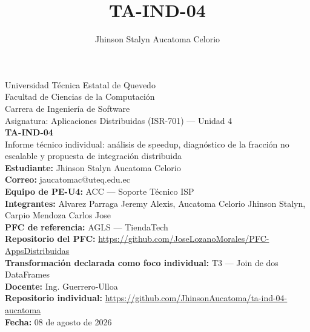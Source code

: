 \documentclass[11pt,a4paper]{article}
\title{TA-IND-04}
\author{Jhinson Stalyn Aucatoma Celorio}
\date{}
\begin{document}
    \begin{titlepage}
        \centering

        {\large Universidad Técnica Estatal de Quevedo}\\
        {\large Facultad de Ciencias de la Computación}\\
        {\large Carrera de Ingeniería de Software}\\[0.5cm]

        {\large Asignatura: Aplicaciones Distribuidas (ISR-701) --- Unidad 4}\\[0.3cm]

        \vspace{1cm}
        {\Large \textbf{TA-IND-04}}\\[0.2cm]
        {\large Informe técnico individual: análisis de speedup, diagnóstico de
        la fracción no escalable y propuesta de integración distribuida}\\[1cm]

        \vspace{1cm}
        \textbf{Estudiante:} Jhinson Stalyn Aucatoma Celorio\\
        \textbf{Correo:} jaucatomac@uteq.edu.ec\\[0.5cm]

        \textbf{Equipo de PE-U4:} ACC --- Soporte Técnico ISP\\
        \textbf{Integrantes:} Alvarez Parraga Jeremy Alexis, Aucatoma Celorio
        Jhinson Stalyn, Carpio Mendoza Carlos Jose\\[0.5cm]

        \textbf{PFC de referencia:} AGLS --- TiendaTech\\
        \textbf{Repositorio del PFC:} \url{https://github.com/JoseLozanoMorales/PFC-AppsDistribuidas}\\[0.5cm]

        \textbf{Transformación declarada como foco individual:} T3 --- Join de
        dos DataFrames\\[0.5cm]

        \textbf{Docente:} Ing. Guerrero-Ulloa\\
        \textbf{Repositorio individual:} \url{https://github.com/JhinsonAucatoma/ta-ind-04-aucatoma}\\
        \textbf{Fecha:} 08 de agosto de 2026

    \end{titlepage}

    \setcounter{section}{1}
\end{document}
